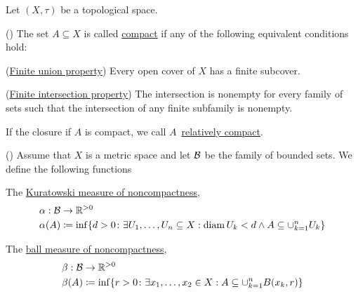 Let $(X, \tau)$ be a topological space.

\begin{definition}\label{def:compact_set}(\cite[40]{Deimling1985})
  The set $A \subseteq X$ is called \uline{compact} if any of the following equivalent conditions hold:
  \begin{defenum}
    \item\label{def:compact_set/union} (\uline{Finite union property}) Every open cover of $X$ has a finite subcover.
    \item\label{def:compact_set/intersection} (\uline{Finite intersection property}) The intersection is nonempty for every family of sets such that the intersection of any finite subfamily is nonempty.
  \end{defenum}

  If the closure if $A$ is compact, we call $A$~\uline{relatively compact}.
\end{definition}

\begin{definition}\label{def:noncompactness_measures}(\cite[definition 7.1]{Deimling1985})
  Assume that $X$ is a metric space and let $\mathcal{B}$ be the family of bounded sets. We define the following functions
  \begin{defenum}
    \item\label{def:noncompactness_measures/sets} The \uline{Kuratowski measure of noncompactness},
    \begin{align*}
      &\alpha: \mathcal{B} \to \mathbb{R}^{>0} \\
      &\alpha(A) \coloneqq \inf \{d > 0 \colon \exists U_1, \ldots, U_n \subseteq X: \operatorname{diam} {U_k} < d \land A \subseteq \cup_{k=1}^n U_k \}
    \end{align*}

    \item\label{def:noncompactness_measures/balls} The \uline{ball measure of noncompactness},
    \begin{align*}
      &\beta: \mathcal{B} \to \mathbb{R}^{>0} \\
      &\beta(A) \coloneqq \inf \{r > 0 \colon \exists x_1, \ldots, x_2 \in X: A \subseteq \cup_{k=1}^n B(x_k, r) \}
    \end{align*}
  \end{defenum}
\end{definition}
